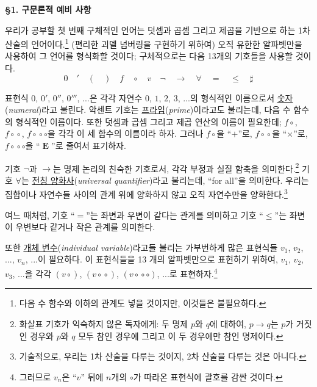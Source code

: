 \documentclass[12pt]{paper}
\begin{document}
  \noindent \textbf{\S 1. 구문론적 예비 사항}

  우리가 공부할 첫 번째 구체적인 언어는 덧셈과 곱셈 그리고 제곱을 기반으로 하는 1차 산술의 언어이다.\footnote
  {
    다음 수 함수와 이하의 관계도 넣을 것이지만, 이것들은 불필요하다.
  }
  (편리한 괴델 넘버링을 구현하기 위하여) 오직 유한한 알파벳만을 사용하여 그 언어를 형식화할 것이다;
  구체적으로는 다음 13개의 기호들을 사용할 것이다.
  $$ 0 \quad ' \quad \left( \quad \right) \quad f \quad \circ \quad v \quad \lnot \quad \rightarrow \quad \forall \quad = \quad \le \quad \sharp $$

  표현식 $0$, $0'$, $0''$, $0'''$, ...은
  각각 자연수 $0$, $1$, $2$, $3$, ...의 형식적인 이름으로서 \underline{숫자}(\textit{numeral})라고 불린다.
  악센트 기호는 \underline{프라임}(\textit{prime})이라고도 불리는데,
  다음 수 함수의 형식적인 이름이다.
  또한 덧셈과 곱셈 그리고 제곱 연산의 이름이 필요한데;
  $f \circ$, $f \! \circ \! \circ$, $f \! \circ \! \circ \circ$을 각각 이 세 함수의 이름이라 하자.
  그러나 $f \circ$을 ``$+$''로, $f \! \circ \! \circ$을 ``$\times$''로, $f \! \circ \! \circ \circ$을 ``$\mathop{\mathbf{E}}$''로 줄여서 표기하자.

  기호 $\lnot$과 $\rightarrow$는 명제 논리의 친숙한 기호로서,
  각각 부정과 실질 함축을 의미한다.\footnote
  {
    화살표 기호가 익숙하지 않은 독자에게: 두 명제 $p$와 $q$에 대하여, $p \rightarrow q$는 $p$가 거짓인 경우와 $p$와 $q$ 모두 참인 경우에 그리고 이 두 경우에만 참인 명제이다.
  }
  기호 $\forall$는 \underline{전칭 양화사}(\textit{universal quantifier})라고 불리는데, ``for all''을 의미한다.
  우리는 집합이나 자연수들 사이의 관계 위에 양화하지 않고 오직 자연수만을 양화한다.\footnote
  {
    기술적으로, 우리는 1차 산술을 다루는 것이지, 2차 산술을 다루는 것은 아니다.
  }

  여느 때처럼, 기호 ``$=$''는 좌변과 우변이 같다는 관계를 의미하고 기호 ``$\leq$''는 좌변이 우변보다 같거나 작은 관계를 의미한다.

  또한 \underline{개체 변수}(\textit{individual variable})라고들 불리는 가부번하게 많은 표현식들 $v_{1}$, $v_{2}$, ..., $v_{n}$, ...이 필요하다.
  이 표현식들을 13 개의 알파벳만으로 표현하기 위하여, $v_{1}$, $v_{2}$, $v_{3}$, ...을 각각 $\left( v \circ \right)$, $\left( v \! \circ \! \circ \right)$, $\left( v \! \circ \! \circ \circ \right)$, ...로 표현하자.\footnote
  {
    그러므로 $v_{n}$은 ``$v$'' 뒤에 $n$개의 $\circ$가 따라온 표현식에 괄호를 감싼 것이다.
  }
\end{document}
